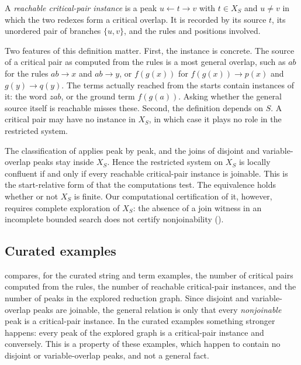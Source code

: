 \begin{definition}
\label{def:reachable-cp-instance}
A \emph{reachable critical-pair instance} is a peak $u \leftarrow t \to v$ with $t \in X_S$ and $u \neq v$ in which the two redexes form a critical overlap. It is recorded by its source $t$, its unordered pair of branches $\{u,v\}$, and the rules and positions involved.
\end{definition}

Two features of this definition matter. First, the instance is concrete. The source of a critical pair as computed from the rules is a most general overlap, such as $ab$ for the rules $ab \to x$ and $ab \to y$, or $f(g(x))$ for $f(g(x)) \to p(x)$ and $g(y) \to q(y)$. The terms actually reached from the starts contain instances of it: the word $zab$, or the ground term $f(g(a))$. Asking whether the general source itself is reachable misses these. Second, the definition depends on $S$. A critical pair may have no instance in $X_S$, in which case it plays no role in the restricted system.

The classification of  applies peak by peak, and the joins of disjoint and variable-overlap peaks stay inside $X_S$. Hence the restricted system on $X_S$ is locally confluent if and only if every reachable critical-pair instance is joinable. This is the start-relative form of  that the computations test. The equivalence holds whether or not $X_S$ is finite. Our computational certification of it, however, requires complete exploration of $X_S$: the absence of a join witness in an incomplete bounded search does not certify nonjoinability ().

\subsection{Curated examples}
\label{subsec:left-linear-trs-bridge}

 compares, for the curated string and term examples, the number of critical pairs computed from the rules, the number of reachable critical-pair instances, and the number of peaks in the explored reduction graph. Since disjoint and variable-overlap peaks are joinable, the general relation is only that every \emph{nonjoinable} peak is a critical-pair instance. In the curated examples something stronger happens: every peak of the explored graph is a critical-pair instance and conversely. This is a property of these examples, which happen to contain no disjoint or variable-overlap peaks, and not a general fact.

